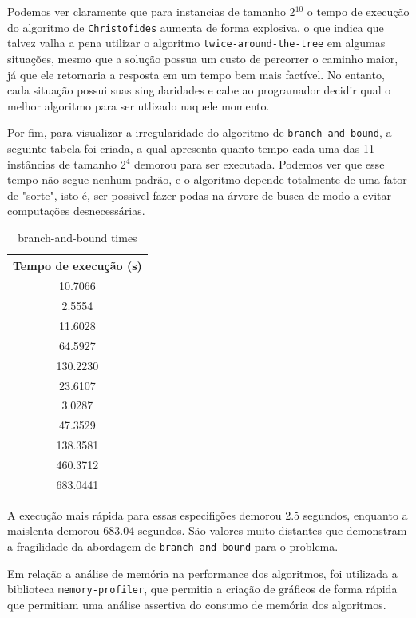 \documentclass{article}
\begin{document}
Podemos ver claramente que para instancias de tamanho 2$^{10}$ o tempo de execução do algoritmo de \texttt{Christofides} aumenta de forma explosiva, o que indica que talvez valha a pena utilizar o algoritmo \texttt{twice-around-the-tree} em algumas situações, mesmo que a solução possua um custo de percorrer o caminho maior, já que ele retornaria a resposta em um tempo bem mais factível. No entanto, cada situação possui suas singularidades e cabe ao programador decidir qual o melhor algoritmo para ser utlizado naquele momento.

Por fim, para visualizar a irregularidade do algoritmo de \texttt{branch-and-bound}, a seguinte tabela foi criada, a qual apresenta quanto tempo cada uma das 11 instâncias de tamanho 2$^4$ demorou para ser executada. Podemos ver que esse tempo não segue nenhum padrão, e o algoritmo depende totalmente de uma fator de "sorte", isto é, ser possivel fazer podas na árvore de busca de modo a evitar computações desnecessárias. 

\begin{table}[H]
\centering
\caption{branch-and-bound times}
\vspace{0.5cm}
\begin{tabular}{c}

Tempo de execu{\c c}{\~a}o (s)\\
\hline  
10.7066 \\
2.5554 \\
11.6028 \\
64.5927 \\
130.2230 \\
23.6107 \\
3.0287 \\
47.3529 \\
138.3581 \\
460.3712 \\
683.0441 \\

\end{tabular}
\end{table}

A execução mais rápida para essas especifições demorou 2.5 segundos, enquanto a maislenta demorou 683.04 segundos. São valores muito distantes que demonstram a fragilidade da abordagem de \texttt{branch-and-bound} para o problema.

Em relação a análise de memória na performance dos algoritmos, foi utilizada a biblioteca \texttt{memory-profiler}, que permitia a criação de gráficos de forma rápida que permitiam uma análise assertiva do consumo de memória dos algoritmos.
\end{document}
